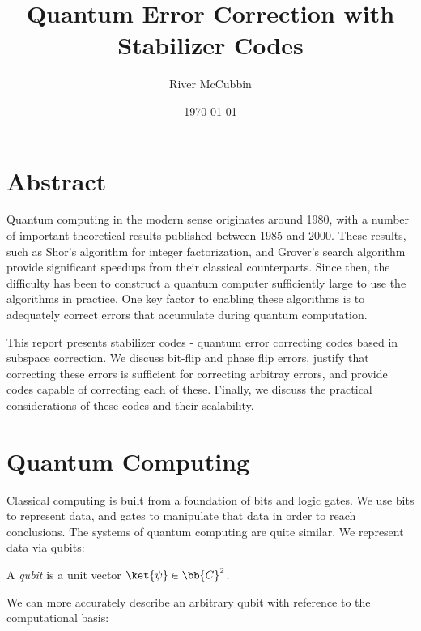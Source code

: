 \documentclass{article}
\title{Quantum Error Correction with Stabilizer Codes}
\author{River McCubbin}
\date{\today}
\begin{document}
\maketitle

\section{Abstract}

Quantum computing in the modern sense originates around 1980, with a number of important theoretical results published between 1985 and 2000.
These results, such as Shor's algorithm for integer factorization, and Grover's search algorithm provide significant speedups from their classical counterparts.
Since then, the difficulty has been to construct a quantum computer sufficiently large to use the algorithms in practice.
One key factor to enabling these algorithms is to adequately correct errors that accumulate during quantum computation.

This report presents stabilizer codes - quantum error correcting codes based in subspace correction.
We discuss bit-flip and phase flip errors, justify that correcting these errors is sufficient for correcting arbitray errors, and provide codes capable of correcting each of these.
Finally, we discuss the practical considerations of these codes and their scalability.

\section{Quantum Computing}

        Classical computing is built from a foundation of bits and logic gates.
        We use bits to represent data, and gates to manipulate that data in order to reach conclusions.
        The systems of quantum computing are quite similar.
        We represent data via qubits:

        \begin{definition}[Qubit]
                A \textit{qubit} is a unit vector $\ket{\psi} \in \bb{C}^2$.
        \end{definition}

        We can more accurately describe an arbitrary qubit with reference to the computational basis:
        
\end{document}
